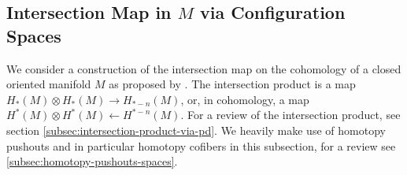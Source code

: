 \documentclass{scrartcl}
\theoremstyle{plain}
\theoremstyle{definition}
\newcommand{\R}{\mathbb R}
\newcommand{\from}{\leftarrow}
\DeclareMathOperator{\Conf}{Conf}
\DeclareMathOperator{\UConf}{Conf}
\DeclareMathOperator{\cConf}{\overline{Conf}}
\begin{document}








\subsection[Intersection Map via Configuration Spaces]{Intersection Map in $M$ via Configuration Spaces}\label{subsec:intersection-in-M-via-conf}

We consider a construction of the intersection map on the cohomology of a closed oriented manifold $M$ as proposed by \cite{naef2019string}. The intersection product is a map $H_*(M) \otimes H_*(M) \to H_{*-n}(M)$, or, in cohomology, a map $H^*(M) \otimes H^*(M) \from H^{*-n}(M)$. For a review of the intersection product, see section \ref{subsec:intersection-product-via-pd}. We heavily make use of homotopy pushouts and in particular homotopy cofibers in this subsection, for a review see \cref{subsec:homotopy-pushouts-spaces}. 
\end{document}
